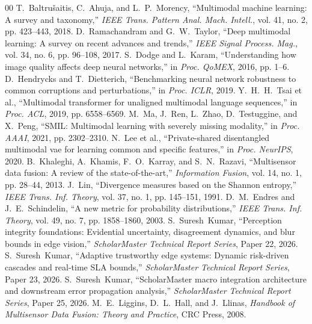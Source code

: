 \documentclass[conference]{IEEEtran}
\begin{document}
\begin{thebibliography}{00}
 T.~Baltru{\v{s}}aitis, C.~Ahuja, and L.~P.~Morency, ``Multimodal machine learning: A survey and taxonomy,'' \emph{IEEE Trans. Pattern Anal. Mach. Intell.}, vol. 41, no. 2, pp. 423--443, 2018.
 D.~Ramachandram and G.~W.~Taylor, ``Deep multimodal learning: A survey on recent advances and trends,'' \emph{IEEE Signal Process. Mag.}, vol. 34, no. 6, pp. 96--108, 2017.
 S.~Dodge and L.~Karam, ``Understanding how image quality affects deep neural networks,'' in \emph{Proc. QoMEX}, 2016, pp. 1--6.
 D.~Hendrycks and T.~Dietterich, ``Benchmarking neural network robustness to common corruptions and perturbations,'' in \emph{Proc. ICLR}, 2019.
 Y.~H.~H.~Tsai et al., ``Multimodal transformer for unaligned multimodal language sequences,'' in \emph{Proc. ACL}, 2019, pp. 6558--6569.
 M.~Ma, J.~Ren, L.~Zhao, D.~Testuggine, and X.~Peng, ``SMIL: Multimodal learning with severely missing modality,'' in \emph{Proc. AAAI}, 2021, pp. 2302--2310.
 N.~Lee et al., ``Private-shared disentangled multimodal vae for learning common and specific features,'' in \emph{Proc. NeurIPS}, 2020.
 B.~Khaleghi, A.~Khamis, F.~O.~Karray, and S.~N.~Razavi, ``Multisensor data fusion: A review of the state-of-the-art,'' \emph{Information Fusion}, vol. 14, no. 1, pp. 28--44, 2013.
 J.~Lin, ``Divergence measures based on the Shannon entropy,'' \emph{IEEE Trans. Inf. Theory}, vol. 37, no. 1, pp. 145--151, 1991.
 D.~M.~Endres and J.~E.~Schindelin, ``A new metric for probability distributions,'' \emph{IEEE Trans. Inf. Theory}, vol. 49, no. 7, pp. 1858--1860, 2003.
 S.~Suresh~Kumar, ``Perception integrity foundations: Evidential uncertainty, disagreement dynamics, and blur bounds in edge vision,'' \emph{ScholarMaster Technical Report Series}, Paper 22, 2026.
 S.~Suresh~Kumar, ``Adaptive trustworthy edge systems: Dynamic risk-driven cascades and real-time SLA bounds,'' \emph{ScholarMaster Technical Report Series}, Paper 23, 2026.
 S.~Suresh~Kumar, ``ScholarMaster macro integration architecture and downstream error propagation analysis,'' \emph{ScholarMaster Technical Report Series}, Paper 25, 2026.
 M.~E.~Liggins, D.~L.~Hall, and J.~Llinas, \emph{Handbook of Multisensor Data Fusion: Theory and Practice}, CRC Press, 2008.
\end{thebibliography}
\end{document}

